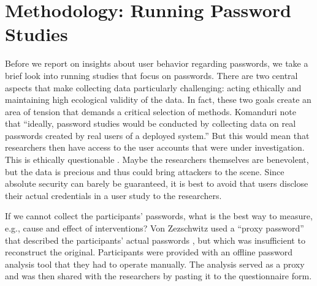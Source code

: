 






\section{Methodology: Running Password Studies}\label{sec:rw:methodology}
Before we report on insights about user behavior regarding passwords, we take a brief look into running studies that focus on passwords. There are two central aspects that make collecting data particularly challenging: acting ethically and maintaining high ecological validity of the data. In fact, these two goals create an area of tension that demands a critical selection of methods. Komanduri \etal note that ``ideally, password studies would be conducted by collecting data on real passwords created by real users of a deployed system.'' \cite{Komanduri2011OfPasswordsAndPeople} But this would mean that researchers then have access to the user accounts that were under investigation. This is ethically questionable \cite{Egelman2012ItsNotStealing}. Maybe the researchers themselves are benevolent, but the data is precious and thus could bring attackers to the scene. Since absolute security can barely be guaranteed, it is best to avoid that users disclose their actual credentials in a user study to the researchers. 

If we cannot collect the participants' passwords, what is the best way to measure, e.g., cause and effect of interventions? Von Zezschwitz \etal used a ``proxy password'' that described the participants' actual passwords \cite{VonZezschwitz2013SurvivalShortest}, but which was insufficient to reconstruct the original. Participants were provided with an offline password analysis tool that they had to operate manually. The analysis served as a proxy and was then shared with the researchers by pasting it to the questionnaire form. 

